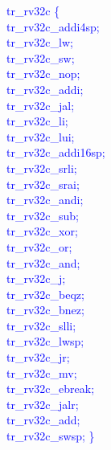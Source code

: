 \textcolor{blue}{
   tr\_rv32c \{ \\%
\indent \indent tr\_rv32c\_addi4sp; \\%
\indent \indent tr\_rv32c\_lw; \\%
\indent \indent tr\_rv32c\_sw; \\%
\indent \indent tr\_rv32c\_nop; \\%
\indent \indent tr\_rv32c\_addi; \\%
\indent \indent tr\_rv32c\_jal; \\%
\indent \indent tr\_rv32c\_li; \\%
\indent \indent tr\_rv32c\_lui; \\%
\indent \indent tr\_rv32c\_addi16sp; \\%
\indent \indent tr\_rv32c\_srli; \\%
\indent \indent tr\_rv32c\_srai; \\%
\indent \indent tr\_rv32c\_andi; \\%
\indent \indent tr\_rv32c\_sub; \\%
\indent \indent tr\_rv32c\_xor; \\%
\indent \indent tr\_rv32c\_or; \\%
\indent \indent tr\_rv32c\_and; \\%
\indent \indent tr\_rv32c\_j; \\%
\indent \indent tr\_rv32c\_beqz; \\%
\indent \indent tr\_rv32c\_bnez; \\%
\indent \indent tr\_rv32c\_slli; \\%
\indent \indent tr\_rv32c\_lwsp; \\%
\indent \indent tr\_rv32c\_jr; \\%
\indent \indent tr\_rv32c\_mv; \\%
\indent \indent tr\_rv32c\_ebreak; \\%
\indent \indent tr\_rv32c\_jalr; \\%
\indent \indent tr\_rv32c\_add; \\%
\indent \indent tr\_rv32c\_swsp; \} \\%
}

